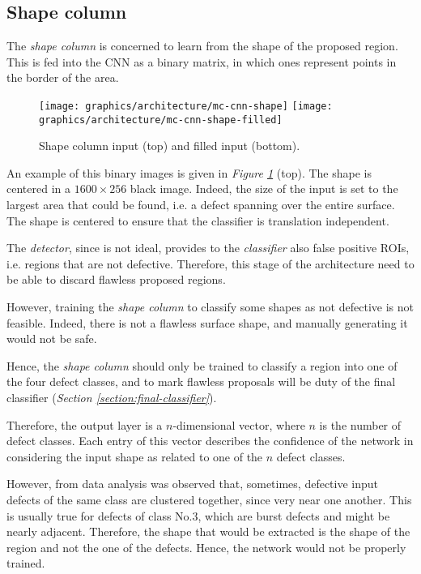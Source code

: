     \subsection{Shape column}\label{section:shape-column}
        \par{
            The \emph{shape column} is concerned to learn from the shape of the proposed region. This is fed into the CNN as a binary matrix, in which ones represent points in the border of the area.
        }
        \begin{figure}
            \centering
            \texttt{[image: graphics/architecture/mc-cnn-shape]}
            \vskip 0.05cm
            \texttt{[image: graphics/architecture/mc-cnn-shape-filled]}
            \caption{Shape column input (top) and filled input (bottom).}\label{fig:mc-cnn:shape-input}
        \end{figure}
        \par{
            An example of this binary images is given in \emph{Figure \ref{fig:mc-cnn:shape-input}} (top). The shape is centered in a $1600\times 256$ black image. Indeed, the size of the input is set to the largest area that could be found, i.e. a defect spanning over the entire surface. The shape is centered to ensure that the classifier is translation independent. 
        }
        \par{
            The \emph{detector}, since is not ideal, provides to the \emph{classifier} also false positive ROIs, i.e. regions that are not defective. Therefore, this stage of the architecture need to be able to discard flawless proposed regions.
        }
        \par{
            However, training the \emph{shape column} to classify some shapes as not defective is not feasible. Indeed, there is not a flawless surface shape, and manually generating it would not be safe.
        }
        \par{
            Hence, the \emph{shape column} should only be trained to classify a region into one of the four defect classes, and to mark flawless proposals will be duty of the final classifier (\emph{Section \ref{section:final-classifier}}).
        }
        \par{
            Therefore, the output layer is a $n$-dimensional vector, where $n$ is the number of defect classes. Each entry of this vector describes the confidence of the network in considering the input shape as related to one of the $n$ defect classes.
        }
        \par{
            However, from data analysis was observed that, sometimes, defective input defects of the same class are clustered together, since very near one another. This is usually true for defects of class No.3, which are burst defects and might be nearly adjacent. Therefore, the shape that would be extracted is the shape of the region and not the one of the defects. Hence, the network would not be properly trained.
        }
